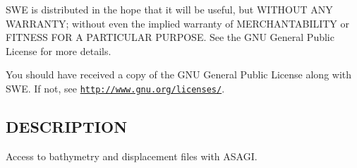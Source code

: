 S\-W\-E is distributed in the hope that it will be useful, but W\-I\-T\-H\-O\-U\-T A\-N\-Y W\-A\-R\-R\-A\-N\-T\-Y; without even the implied warranty of M\-E\-R\-C\-H\-A\-N\-T\-A\-B\-I\-L\-I\-T\-Y or F\-I\-T\-N\-E\-S\-S F\-O\-R A P\-A\-R\-T\-I\-C\-U\-L\-A\-R P\-U\-R\-P\-O\-S\-E. See the G\-N\-U General Public License for more details.

You should have received a copy of the G\-N\-U General Public License along with S\-W\-E. If not, see \href{http://www.gnu.org/licenses/}{\tt http\-://www.\-gnu.\-org/licenses/}.\hypertarget{NetCdfWriter_8hh_DESCRIPTION}{}\subsection{D\-E\-S\-C\-R\-I\-P\-T\-I\-O\-N}\label{NetCdfWriter_8hh_DESCRIPTION}
Access to bathymetry and displacement files with A\-S\-A\-G\-I. 